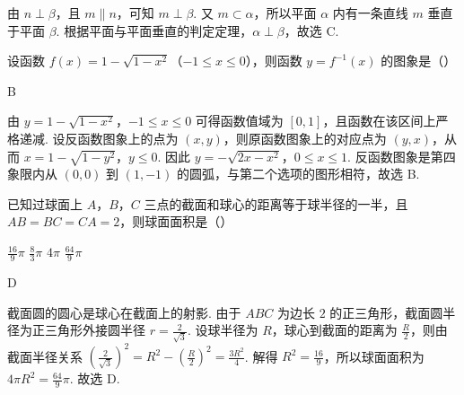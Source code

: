 \documentclass[UTF8,a4paper,oneside,11pt]{ctexbook}
\begin{document}
\begin{solution}
由 \(n\perp\beta\)，且 \(m\parallel n\)，可知 \(m\perp\beta\). 又 \(m\subset\alpha\)，所以平面 \(\alpha\) 内有一条直线 \(m\) 垂直于平面 \(\beta\). 根据平面与平面垂直的判定定理，\(\alpha\perp\beta\)，故选 C.
\end{solution}

\begin{problem}
设函数 \(f(x) = 1 - \sqrt{1 - x^2}\)（\(-1 \leqslant x \leqslant 0\)），则函数 \(y = f^{-1}(x) \) 的图象是（\quad）

\choices
    {}
    {}
    {}
    {}
\end{problem}

\begin{answer}
B
\end{answer}

\begin{solution}
由 \(y=1-\sqrt{1-x^2}\)，\(-1\leqslant x\leqslant0\) 可得函数值域为 \([0,1]\)，且函数在该区间上严格递减. 设反函数图象上的点为 \((x,y)\)，则原函数图象上的对应点为 \((y,x)\)，从而 \(x=1-\sqrt{1-y^2}\)，\(y\leqslant0\). 因此 \(y=-\sqrt{2x-x^2}\)，\(0\leqslant x\leqslant1\).
反函数图象是第四象限内从 \((0,0)\) 到 \((1,-1)\) 的圆弧，与第二个选项的图形相符，故选 B.
\end{solution}

\begin{problem}
已知过球面上 \(A\)，\(B\)，\(C\) 三点的截面和球心的距离等于球半径的一半，且 \(AB = BC = CA = 2 \)，则球面面积是（\quad）

\choices
    {\(\frac{16}{9}\pi\)}
    {\(\frac{8}{3}\pi\)}
    {\(4\pi\)}
    {\(\frac{64}{9}\pi\)}
\end{problem}

\begin{answer}
D
\end{answer}

\begin{solution}
截面圆的圆心是球心在截面上的射影. 由于 \(ABC\) 为边长 \(2\) 的正三角形，截面圆半径为正三角形外接圆半径 \(r=\frac{2}{\sqrt{3}}\). 设球半径为 \(R\)，球心到截面的距离为 \(\frac{R}{2}\)，则由截面半径关系 \(\left(\frac{2}{\sqrt{3}}\right)^2=R^2-\left(\frac{R}{2}\right)^2=\frac{3R^2}{4}\). 解得 \(R^2=\frac{16}{9}\)，所以球面面积为 \(4\pi R^2=\frac{64}{9}\pi\).
故选 D.
\end{solution}
\end{document}
